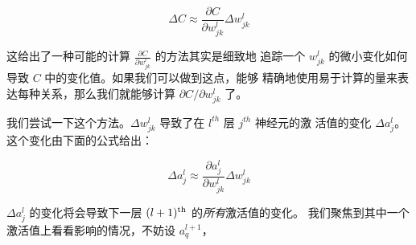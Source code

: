 \begin{equation}
  \Delta C \approx \frac{\partial C}{\partial w^l_{jk}} \Delta w^l_{jk}
  \label{eq:47}\tag{47}
\end{equation}

这给出了一种可能的计算 $\frac{\partial C}{\partial w_{jk}^l}$ 的方法其实是细致地
追踪一个 $w_{jk}^l$ 的微小变化如何导致 $C$ 中的变化值。如果我们可以做到这点，能够
精确地使用易于计算的量来表达每种关系，那么我们就能够计算 $\partial C / \partial
w^l_{jk}$ 了。

我们尝试一下这个方法。$\Delta w_{jk}^l$ 导致了在 $l^{th}$ 层 $j^{th}$ 神经元的激
活值的变化 $\Delta a_j^l$。这个变化由下面的公式给出：

\begin{equation} 
  \Delta a^l_j \approx \frac{\partial a^l_j}{\partial w^l_{jk}} \Delta w^l_{jk}
  \label{eq:48}\tag{48}
\end{equation}

$\Delta a_j^l$ 的变化将会导致下一层 $(l+1)^{\rm th}$ 的\emph{所有}激活值的变化。
我们聚焦到其中一个激活值上看看影响的情况，不妨设 $a_q^{l+1}$，

